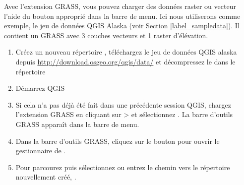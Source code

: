 
Avec l'extension GRASS, vous pouvez charger des donn\'ees raster ou vecteur l'aide du bouton appropri\'e dans la barre de menu. Ici nous utiliserons comme exemple, le jeu de donn\'ees QGIS Alaska (voir Section \ref{label_sampledata}). Il contient un  GRASS avec 3 couches vecteurs et 1 raster d'\'el\'evation.

\begin{enumerate}
  \item Cr\'eez un nouveau r\'epertoire , t\'el\'echargez le jeu de donn\'ees QGIS alaska  depuis  \url{http://download.osgeo.org/qgis/data/} et d\'ecompressez le dans le r\'epertoire 
  \item D\'emarrez QGIS
  \item Si cela n'a pas d\'ej\`a \'et\'e fait dans une pr\'ec\'edente session QGIS, chargez l'extension GRASS en cliquant sur  >  et s\'electionnez . La barre d'outils GRASS appara\^it dans la barre de menu.
  \item Dans la barre d'outils GRASS, cliquez sur le bouton  pour ouvrir le gestionnaire de .
  \item Pour  parcourez puis s\'electionnez ou entrez le chemin vers le r\'epertoire nouvellement cr\'e\'e, .

\end{enumerate}
